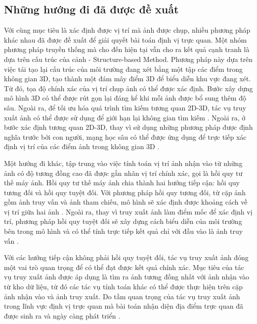 \subsection{Những hướng đi đã được đề xuất}

Với cùng mục tiêu là xác định được vị trí mà ảnh được chụp, nhiều phương pháp khác nhau đã được đề xuất để giải quyết bài toán định vị trực quan. Một nhóm phương pháp truyền thống mà cho đến hiện tại vẫn cho ra kết quả cạnh tranh là dựa trên cấu trúc của cảnh - Structure-based Method. Phương pháp này dựa trên việc tái tạo lại cấu trúc của môi trường đang xét bằng một tập các điểm trong không gian 3D, tạo thành một đám mây điểm 3D để biểu diễn khu vực đang xét. Từ đó, tọa độ chính xác của vị trí chụp ảnh có thể được xác định. Bước xây dựng mô hình 3D có thể được rút gọn lại đáng kể khi mỗi ảnh được bổ sung thêm độ sâu. Ngoài ra, để tối ưu hóa quá trình tìm kiếm tương quan 2D-3D, tác vụ truy xuất ảnh có thể được sử dụng để giới hạn lại không gian tìm kiếm \cite{sarlin2019coarse}. Ngoài ra, ở bước xác định tương quan 2D-3D, thay vì sử dụng những phương pháp được định nghĩa trước bởi con người, mạng học sâu có thể được ứng dụng để trực tiếp xác định vị trí của các điểm ảnh trong không gian 3D \cite{brachmann2021visual}.

Một hướng đi khác, tập trung vào việc tính toán vị trí ảnh nhận vào từ những ảnh có độ tương đồng cao đã được gắn nhãn vị trí chính xác, gọi là hồi quy tư thế máy ảnh. Hồi quy tư thế máy ảnh chia thành hai hướng tiếp cận: hồi quy tương đối và hồi quy tuyệt đối. Với phương pháp hồi quy tương đối, từ cặp ảnh gồm ảnh truy vấn và ảnh tham chiếu, mô hình sẽ xác định được khoảng cách về vị trí giữa hai ảnh \cite{zhou2020learn}. Ngoài ra, thay vì truy xuất ảnh làm điểm mốc để xác định vị trí, phương pháp hồi quy tuyệt đối sẽ xây dựng cách biểu diễn của môi trường bên trong mô hình và có thể tính trực tiếp kết quả chỉ với đầu vào là ảnh truy vấn \cite{kendall2016posenet}.

Với các hướng tiếp cận không phải hồi quy tuyệt đối, tác vụ truy xuất ảnh đóng một vai trò quan trọng để có thể đạt được kết quả chính xác. Mục tiêu của tác vụ truy xuất ảnh được áp dụng là tìm ra ảnh tương đồng nhất với ảnh nhận vào từ kho dữ liệu, từ đó các tác vụ tính toán khác có thể được thực hiện trên cặp ảnh nhận vào và ảnh truy xuất. Do tầm quan trọng của tác vụ truy xuất ảnh trong lĩnh vực định vị trực quan mà bài toán nhận diện địa điểm trực quan đã được sinh ra và ngày càng phát triển \cite{berton2022rethinking}\cite{keetha2023anyloc}\cite{alibey2023mixvpr}.

